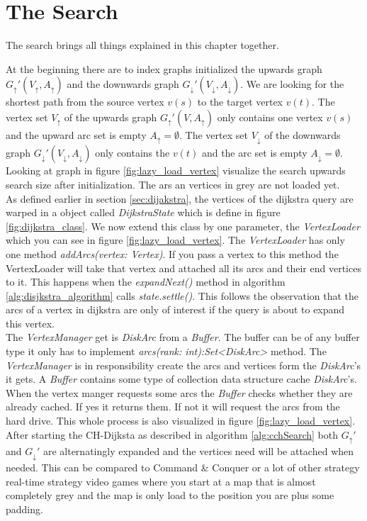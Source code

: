 \section{The Search}

The search brings all things explained in this chapter together. 

At the beginning there are to index graphs initialized the upwards graph $G_\uparrow'(V_\uparrow, A_\uparrow)$ and the downwards graph $G_\downarrow'(V_\downarrow, A_\downarrow)$. We are looking for the shortest
path from the source vertex $v(s)$ to the target vertex $v(t)$. The vertex set $V_\uparrow$ of the upwards graph $G_\uparrow'(V, A_\uparrow)$ only contains one vertex $v(s)$ and the upward arc set is empty $A_\uparrow = \emptyset$. 
The vertex set $V_\downarrow$ of the downwards graph $G_\downarrow'(V_\downarrow, A_\downarrow)$ only contains the $v(t)$ and the arc set is empty $A_\downarrow = \emptyset$.
Looking at graph in figure \ref{fig:lazy_load_vertex} visualize the search upwards search size after initialization. The ars an vertices in grey are not loaded yet.
\\
As defined earlier in section \ref{sec:dijakstra}, the vertices of the dijkstra query are warped in a object called \textit{DijkstraState} which is define in figure \ref{fig:dijkstra_class}. We now extend this 
class by one parameter, the \textit{VertexLoader} which you can see in figure \ref{fig:lazy_load_vertex}. The \textit{VertexLoader} has only one method \textit{addArcs(vertex: Vertex)}. If you pass a vertex to this method
the VertexLoader will take that vertex and attached all its arcs and their end vertices to it. This happens when the \textit{expandNext()} method in algorithm \ref{alg:disjkstra_algorithm} calls \textit{state.settle()}. This 
follows the observation that the arcs of a vertex in dijkstra are only of interest if the query is about to expand this vertex.
\\
The \textit{VertexManager} get is \textit{DiskArc} from a \textit{Buffer}. The buffer can be of any buffer type it only has to implement \textit{arcs(rank: int):Set<DiskArc>} method. The \textit{VertexManager} is in responsibility 
create the arcs and vertices form the \textit{DiskArc}'s it gets. A \textit{Buffer} contains some type of collection data structure cache \textit{DiskArc}'s. When the vertex manger requests some arcs the \textit{Buffer} checks whether 
they are already cached. If yes it returns them. If not it will request the arcs from the hard drive. This whole process is also visualized in figure \ref{fig:lazy_load_vertex}.
\\
After starting the CH-Dijksta as described in algorithm \ref{alg:cchSearch} both $G_\uparrow'$ and $G_\downarrow'$ are alternatingly expanded and the vertices need will be attached when needed. This can be 
compared to Command \& Conquer or a lot of other strategy  real-time strategy video games where you start at a map that is almost completely grey and the map is only load to the position you are plus some padding.

